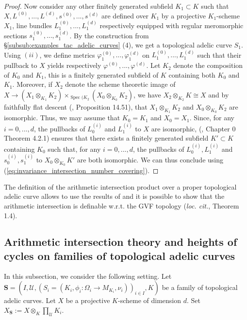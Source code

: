 \documentclass [11pt,reqno]{amsart}
\newcommand{\1}{\mathmybb{1}}
\def\cU{{\mathcal{U}}}
\def\Spec{\operatorname{Spec}}
\begin{document}
\begin{proof}
Now consider any other finitely generated subfield $K_{1}\subset K$ such that $X,L^{(0)},...,L^{(d)},s^{(0)},...,s^{(d)}$ are defined over $K_{1}$ by a projective $K_{1}$-scheme $X_{1}$, line bundles $L_{1}^{(0)},...,L_{1}^{(d)}$ respectively equipped with regular meromorphic sections $s_{1}^{(0)},...,s_{1}^{(d)}$. By the construction from \S \ref{subsub:examples_tac_adelic_curves} (4), we get a topological adelic curve $S_{1}$. Using $(ii)$, we define metrics $\varphi_{1}^{(0)},...,\varphi_{1}^{(d)}$ on $L_{1}^{(0)},...,L_{1}^{(d)}$ such that their pullback to $X$ yields respectively $\varphi^{(0)},...,\varphi^{(d)}$. Let $K_{2}$ denote the composition of $K_{0}$ and $K_{1}$, this is a finitely generated subfield of $K$ containing both $K_{0}$ and $K_{1}$. Moreover, if $X_{2}$ denote the scheme theoretic image of $X\to (X_{1}\otimes_{K_{1}}K_{2})\times_{\Spec(K_{2}}(X_{0}\otimes_{K_{0}}K_{2})$, we have $X_{2}\otimes_{K_{2}}K\cong X$ and by faithfully flat descent (\cite{Gortz10}, Proposition 14.51), that $X_{1}\otimes_{K_{1}}K_{2}$ and $X_{0}\otimes_{K_{0}}K_{2}$ are isomorphic. Thus, we may assume that $K_{0}=K_{1}$ and $X_{0}=X_{1}$. Since, for any $i=0,...,d$, the pullbacks of $L_{0}^{(i)}$ and $L_{1}^{(i)}$ to $X$ are isomorphic, (\cite{Fujiwara-Kato}, Chapter 0 Theorem 4.2.1) ensures that there exists a finitely generated subfield $K'\subset K$ containing $K_{0}$ such that, for any $i=0,...,d$, the pullbacks of $L_{0}^{(i)},L_{1}^{(i)}$ and $s_{0}^{(i)},s_{1}^{(i)}$ to $X_{0}\otimes_{K_{0}}K'$ are both isomorphic. We can thus conclude using (\ref{eq:invariance_intersection_number_covering}).
\end{proof}

\begin{remark}
\label{rem:continuity_of_the_arithmetic_intersection_product_GVF_topology}
The definition of the arithmetic intersection product over a proper topological adelic curve allows to use the results of \cite{DHS24} and it is possible to show that the arithmetic intersection is definable w.r.t. the GVF topology (\emph{loc. cit.}, Theorem 1.4).
\end{remark}

\subsection{Arithmetic intersection theory and heights of cycles on families of topological adelic curves}
\label{sub:arithmetic_intersection_theory_family_tac}

In this subsection, we consider the following setting. Let $\mathbf{S}=(I,\cU,(S_{i}=(K_{i},\phi_{i}:\Omega_{i}\to M_{K_{i}},\nu_{i}))_{i\in I},K)$ be a family of topological adelic curves. Let $X$ be a projective $K$-scheme of dimension $d$. Set $X_{\mathbf{S}}:=X\otimes_{K}\prod_{\cU}K_{i}$. %
\end{document}
